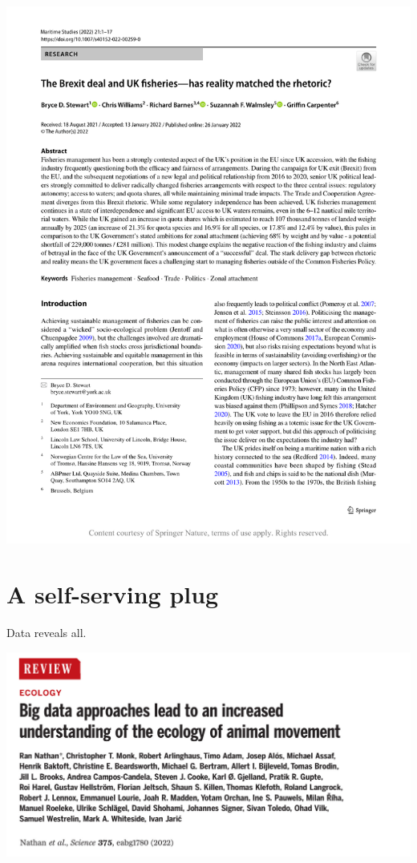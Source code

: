 \documentclass[
]{book}
\begin{document}
\begin{center}\includegraphics{_images/brexit} \end{center}

\hypertarget{a-self-serving-plug}{%
\chapter{A self-serving plug}\label{a-self-serving-plug}}

Data reveals all.

\begin{center}\includegraphics{_images/big} \end{center}
\end{document}
